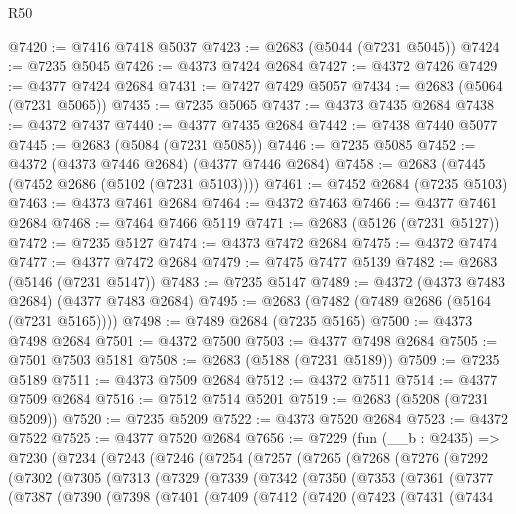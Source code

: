 \begin{lexlean}{R50}
\begin{coremodule}
@7420 := @7416 @7418 @5037
@7423 := @2683 (@5044 (@7231 @5045))
@7424 := @7235 @5045
@7426 := @4373 @7424 @2684
@7427 := @4372 @7426
@7429 := @4377 @7424 @2684
@7431 := @7427 @7429 @5057
@7434 := @2683 (@5064 (@7231 @5065))
@7435 := @7235 @5065
@7437 := @4373 @7435 @2684
@7438 := @4372 @7437
@7440 := @4377 @7435 @2684
@7442 := @7438 @7440 @5077
@7445 := @2683 (@5084 (@7231 @5085))
@7446 := @7235 @5085
@7452 := @4372 (@4373 @7446 @2684) (@4377 @7446 @2684)
@7458 := @2683 (@7445 (@7452 @2686 (@5102 (@7231 @5103))))
@7461 := @7452 @2684 (@7235 @5103)
@7463 := @4373 @7461 @2684
@7464 := @4372 @7463
@7466 := @4377 @7461 @2684
@7468 := @7464 @7466 @5119
@7471 := @2683 (@5126 (@7231 @5127))
@7472 := @7235 @5127
@7474 := @4373 @7472 @2684
@7475 := @4372 @7474
@7477 := @4377 @7472 @2684
@7479 := @7475 @7477 @5139
@7482 := @2683 (@5146 (@7231 @5147))
@7483 := @7235 @5147
@7489 := @4372 (@4373 @7483 @2684) (@4377 @7483 @2684)
@7495 := @2683 (@7482 (@7489 @2686 (@5164 (@7231 @5165))))
@7498 := @7489 @2684 (@7235 @5165)
@7500 := @4373 @7498 @2684
@7501 := @4372 @7500
@7503 := @4377 @7498 @2684
@7505 := @7501 @7503 @5181
@7508 := @2683 (@5188 (@7231 @5189))
@7509 := @7235 @5189
@7511 := @4373 @7509 @2684
@7512 := @4372 @7511
@7514 := @4377 @7509 @2684
@7516 := @7512 @7514 @5201
@7519 := @2683 (@5208 (@7231 @5209))
@7520 := @7235 @5209
@7522 := @4373 @7520 @2684
@7523 := @4372 @7522
@7525 := @4377 @7520 @2684
@7656 := @7229
    (fun (__b : @2435) =>
    @7230
      (@7234
        (@7243
          (@7246
            (@7254
              (@7257
                (@7265
                  (@7268
                    (@7276
                      (@7292
                        (@7302
                          (@7305
                            (@7313
                              (@7329
                                (@7339
                                  (@7342
                                    (@7350
                                      (@7353
                                        (@7361
                                          (@7377
                                            (@7387
                                              (@7390
                                                (@7398
                                                  (@7401
                                                    (@7409
                                                      (@7412
                                                        (@7420
                                                          (@7423
                                                            (@7431
                                                              (@7434

\end{coremodule}
\end{lexlean}
